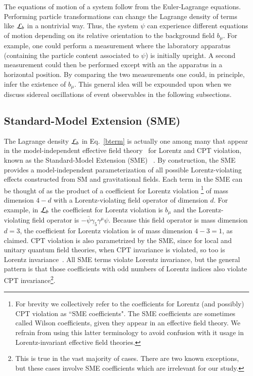 The equations of motion of a system follow from the Euler-Lagrange equations.
Performing particle transformations can change the
Lagrange density of terms like ${\cal L}_b$ in a nontrivial way. Thus, the system $\psi$ can experience
different equations of motion depending on its relative orientation to the background
field $b_\mu$. For example, one could perform a measurement where the laboratory apparatus
(containing the particle content associated to $\psi$) is initially upright. 
A second measurement could then be performed except with an
the apparatus in a horizontal position. By comparing the two measurements 
one could, in principle, infer the existence of $b_\mu$. This general idea will
be expounded upon when we discuss sidereal oscillations 
of event observables in the following subsections. 
%
%
\subsection{Standard-Model Extension (SME)}
\label{ssec:SME}
%
%
The Lagrange density ${\cal L}_b$ in Eq.~\eqref{bterm} is actually one
among many that appear in the model-independent 
effective field theory~\cite{Weinberg:2009bg} for Lorentz 
and CPT violation, known as the Standard-Model Extension (SME)
~\cite{ck96,ck98}. By construction, the SME provides a
model-independent parameterization
of all possible Lorentz-violating effects
constructed from SM and gravitational fields.
Each term in the SME can be thought of as
the product of a coefficient
for Lorentz violation
\footnote{For brevity 
we collectively refer to the 
coefficients for Lorentz (and possibly) CPT 
violation as ``SME coefficients". The SME coefficients
are sometimes called Wilson coefficients, given
they appear in an effective field theory. We refrain 
from using this latter terminology to avoid 
confusion with it usage in Lorentz-invariant effective
field theories.} 
of mass dimension $4-d$
with a Lorentz-violating field operator of dimension $d$.
For example, in ${\cal L}_b$ the coefficient for Lorentz violation is $b_\mu$
and the Lorentz-violating field operator is $-\bar\psi \gamma_5\gamma^\mu \psi$.
Because this field operator is mass dimension $d=3$, the coefficient for
Lorentz violation is of mass dimension $4-3=1$, as claimed.
CPT violation is also parametrized by the SME,
since for local and unitary quantum field theories,
when CPT invariance is violated, so too
is Lorentz invariance~\cite{ck97,owg}.
All SME terms violate Lorentz invariance, but the general pattern is
that those coefficients with odd numbers
of Lorentz indices also violate CPT invariance\footnote{This is true in the vast majority
of cases. There are two known exceptions,
but these cases involve SME coefficients which are irrelevant
for our study.}.

